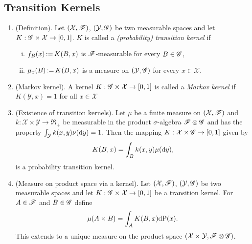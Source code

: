 \documentclass[a4paper,10pt]{scrbook}
\begin{document}
\subsection{Transition Kernels}\label{sec:transition_kernel}
\begin{enumerate}
 \item (Definition). Let $(\mathcal{X},\mathscr{F})$, $(\mathcal{Y},\mathscr{G})$ be two measurable spaces and let $K:\mathscr{G}\times \mathcal{X}\to [0,1]$.
       $K$ is called a \textit{(probability) transition kernel} if
       \begin{enumerate}[i.]
        \item $f_B(x) {}\mathop{\mathrel{:}=}{} K(B,x)$ is $\mathscr{F}$-measurable for every $B\in\mathscr{G}$,
        \item $\mu_x(B) {}\mathop{\mathrel{:}=}{} K(B,x)$ is a measure on $(\mathcal{Y},\mathscr{G})$ for every $x\in \mathcal{X}$.
       \end{enumerate}
 \item (Markov kernel). A kernel $K:\mathscr{G}\times \mathcal{X}\to [0,1]$ is called a \textit{Markov kernel} if 
       $K(\mathcal{Y}, x)=1$ for all $x\in\mathcal{X}$
 \item (Existence of transition kernels). Let $\mu$ be a finite measure on 
       $(\mathcal{X},\mathscr{F})$ and $k:\mathcal{X}\times \mathcal{Y}\to\Re_+$
       be measurable in the product $\sigma$-algebra $\mathscr{F}\otimes \mathscr{G}$ and has the property $\int_{\mathcal{Y}} k(x,y)\nu(\mathrm{d} y)=1$. Then
       the mapping $K:\mathcal{X} \times \mathscr{G} \to [0,1]$ given by
       \[
        K(B,x) = \int_B k(x,y) \mu(\mathrm{d} y),
       \]
       is a probability transition kernel.
 \item (Measure on product space via a kernel). 
       Let $(\mathcal{X},\mathscr{F})$, $(\mathcal{Y},\mathscr{G})$ be two measurable spaces and let $K:\mathscr{G}\times\mathcal{X}\to [0,1]$
       be a transition kernel. For $A\in\mathscr{F}$ and $B\in\mathscr{G}$ define 
       \[
        \mu(A\times B) = \int_A K(B,x)\mathrm{d}\mathrm{P}(x).
       \]
       This extends to a unique measure on the product space $(\mathcal{X}\times\mathcal{Y}, \mathscr{F}\otimes\mathscr{G})$.
\end{enumerate}
\end{document}
